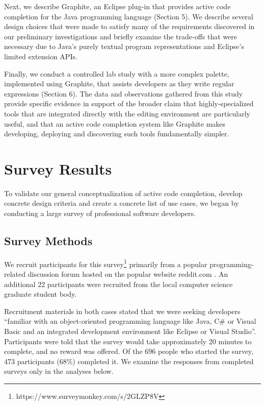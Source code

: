 \documentclass[10pt, conference, compsocconf]{IEEEtran}
\begin{document}
Next, we describe Graphite, an Eclipse plug-in that provides active code completion for the Java programming language (Section 5). We describe several design choices that were made to satisfy many of the requirements discovered in our preliminary investigations and briefly examine the trade-offs that were necessary due to Java's purely textual program representations and Eclipse's limited extension APIs.

Finally, we conduct a controlled lab study with a more complex palette, implemented using Graphite, that assists  developers as they write regular expressions (Section 6). The data and observations gathered from this study provide  specific evidence in support of the broader claim that highly-specialized tools that are integrated directly with the editing environment are particularly useful, and that an active code completion system like Graphite makes developing, deploying and discovering such tools fundamentally simpler.

\section{Survey Results}
To validate our general conceptualization of active code completion, develop concrete design criteria and create a concrete list of use cases, we began by conducting a large survey of professional software developers.

\subsection{Survey Methods}
We recruit participants for this survey\footnote{https://www.surveymonkey.com/s/2GLZP8V} primarily from a popular programming-related discussion forum hosted on the popular website reddit.com \cite{reddit_programming}. An additional 22 participants were recruited from the local computer science graduate student body. 

Recruitment materials in both cases stated that we were seeking developers ``familiar with an object-oriented programming language like Java, C\# or Visual Basic and an integrated development environment like Eclipse or Visual Studio''.
Participants were told that the survey would take approximately 20 minutes to complete, and no reward was offered. Of the 696 people who started the survey, 473 participants (68\%) completed it. We examine the responses from completed surveys only in the analyses below.
\end{document}
